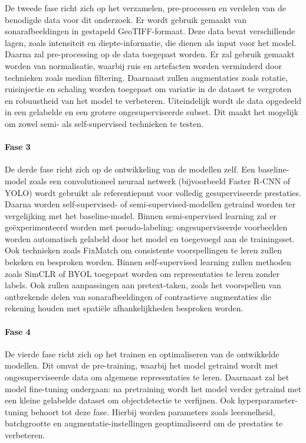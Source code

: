 De tweede fase richt zich op het verzamelen, pre-processen en verdelen van de benodigde data voor dit onderzoek. Er wordt gebruik gemaakt van sonarafbeeldingen in gestapeld GeoTIFF-formaat. Deze data bevat verschillende lagen, zoals intensiteit en diepte-informatie, die dienen als input voor het model. Daarna zal pre-processing op de data toegepast worden. Er zal gebruik gemaakt worden van normalisatie, waarbij ruis en artefacten worden verminderd door technieken zoals median filtering. Daarnaast zullen augmentaties zoals rotatie, ruisinjectie en schaling worden toegepast om variatie in de dataset te vergroten en robuustheid van het model te verbeteren. Uiteindelijk wordt de data opgedeeld in een gelabelde en een grotere ongesuperviseerde subset. Dit maakt het mogelijk om zowel semi- als self-supervised technieken te testen.

\paragraph{Fase 3}

De derde fase richt zich op de ontwikkeling van de modellen zelf. Een baseline-model zoals een convolutioneel neuraal netwerk (bijvoorbeeld Faster R-CNN of YOLO) wordt gebruikt als referentiepunt voor volledig gesuperviseerde prestaties. Daarna worden self-supervised- of semi-supervised-modellen getraind worden ter vergelijking met het baseline-model. Binnen semi-supervised learning zal er geëxperimenteerd worden met pseudo-labeling: ongesuperviseerde voorbeelden worden automatisch gelabeld door het model en toegevoegd aan de trainingsset. Ook technieken zoals FixMatch om consistente voorspellingen te leren zullen bekeken en besproken worden. Binnen self-supervised learning zullen methoden zoals SimCLR of BYOL toegepast worden om representaties te leren zonder labels. Ook zullen aanpassingen aan pretext-taken, zoals het voorspellen van ontbrekende delen van sonarafbeeldingen of contrastieve augmentaties die rekening houden met spatiële afhankelijkheden besproken worden.

\paragraph{Fase 4}

De vierde fase richt zich op het trainen en optimaliseren van de ontwikkelde modellen. Dit omvat de pre-training, waarbij het model getraind wordt met ongesuperviseerde data om algemene representaties te leren. Daarnaast zal het model fine-tuning ondergaan: na pretraining wordt het model verder getraind met een kleine gelabelde dataset om objectdetectie te verfijnen. Ook hyperparameter-tuning behoort tot deze fase. Hierbij worden parameters zoals leersnelheid, batchgrootte en augmentatie-instellingen geoptimaliseerd om de prestaties te verbeteren.

